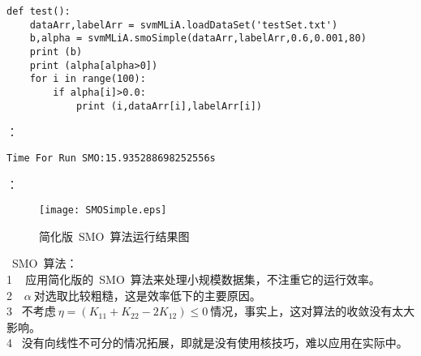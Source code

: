\begin{lstlisting}
def test():
    dataArr,labelArr = svmMLiA.loadDataSet('testSet.txt')
    b,alpha = svmMLiA.smoSimple(dataArr,labelArr,0.6,0.001,80)
    print (b)
    print (alpha[alpha>0])
    for i in range(100):
        if alpha[i]>0.0:
            print (i,dataArr[i],labelArr[i])

\end{lstlisting}

：
\begin{lstlisting}
Time For Run SMO:15.935288698252556s
\end{lstlisting}

：
\begin{figure}[!htb]
  \centering
  \texttt{[image: SMOSimple.eps]}
  \caption{简化版~SMO~算法运行结果图}
\end{figure}

~SMO~算法：\\
\textcircled{\footnotesize{1}}  ~ 应用简化版的~SMO~算法来处理小规模数据集，不注重它的运行效率。       \\
\textcircled{\footnotesize{2}}  ~$~\alpha~$对选取比较粗糙，这是效率低下的主要原因。       \\
\textcircled{\footnotesize{3}}  ~不考虑$~\eta=(K_{11}+K_{22}-2K_{12})\leq0~$情况，事实上，这对算法的收敛没有太大影响。        \\
\textcircled{\footnotesize{4}}  ~没有向线性不可分的情况拓展，即就是没有使用核技巧，难以应用在实际中。        \\





